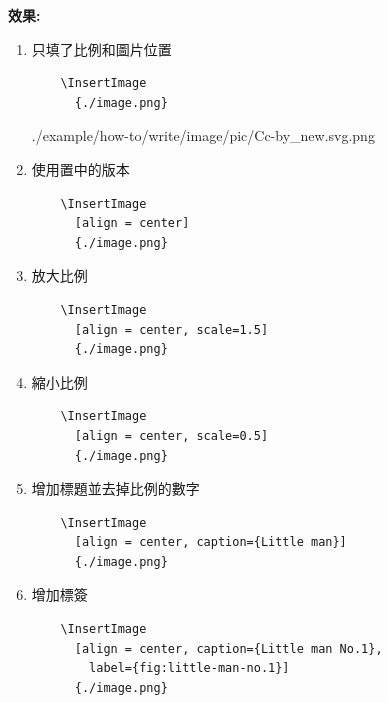   \newpage
  {\bf 效果:}
  \begin{enumerate}
  \item
  {
    只填了比例和圖片位置
    \begin{verbatim}
    \InsertImage
      {./image.png}
    \end{verbatim}
    \InsertImage
      {./example/how-to/write/image/pic/Cc-by_new.svg.png}
  } %

  \item
  {
    使用置中的版本
    \begin{verbatim}
    \InsertImage
      [align = center]
      {./image.png}
    \end{verbatim}
  } %

  \item
  {
    放大比例
    \begin{verbatim}
    \InsertImage
      [align = center, scale=1.5]
      {./image.png}
    \end{verbatim}
  } %

  \newpage

  \item
  {
    縮小比例
    \begin{verbatim}
    \InsertImage
      [align = center, scale=0.5]
      {./image.png}
    \end{verbatim}
  } %

  \item
  {
    增加標題並去掉比例的數字
    \begin{verbatim}
    \InsertImage
      [align = center, caption={Little man}]
      {./image.png}
    \end{verbatim}
  } %

  \newpage
  \item
  {
    增加標簽
    \begin{verbatim}
    \InsertImage
      [align = center, caption={Little man No.1},
        label={fig:little-man-no.1}]
      {./image.png}
    \end{verbatim}

}
\end{enumerate}
